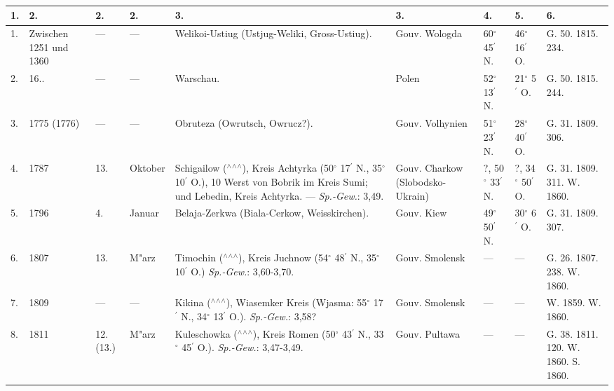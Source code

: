 \documentclass[a4paper, 8pt, oneside, polutonikogreek, german]{article}
\begin{document}
\subsubsection{}
\begin{center}
    \footnotesize
    \begin{longtable}{|p{3mm}|p{10mm}|p{5mm}|p{13mm}|p{25mm}|p{13mm}|p{10mm}|p{10mm}|p{11mm}|}
    \hline
        1. & 2. & 2. & 2. & 3. & 3. & 4. & 5. & 6. \\ \hline
        1. & Zwischen 1251 und 1360 & --- & --- & Welikoi-Ustiug (Ustjug-Weliki, Gross-Ustiug). & Gouv. Wologda & 60$^\circ$ 45$^\prime$ N. & 46$^\circ$ 16$^\prime$ O. & G. 50. 1815. 234. \\ \hline
        2. & 16.. & --- & --- & Warschau. & Polen & 52$^\circ$ 13$^\prime$ N. & 21$^\circ$ 5$^\prime$ O. & G. 50. 1815. 244. \\ \hline
        3. & 1775 (1776) & --- & --- & Obruteza (Owrutsch, Owrucz?). & Gouv. Volhynien & 51$^\circ$ 23$^\prime$ N. & 28$^\circ$ 40$^\prime$ O. & G. 31. 1809. 306. \\ \hline
        4. & 1787 & 13. & Oktober & Schigailow ($^\wedge$$^\wedge$$^\wedge$), Kreis Achtyrka (50$^\circ$ 17$^\prime$ N., 35$^\circ$ 10$^\prime$ O.), 10 Werst von Bobrik im Kreis Sumi; und Lebedin, Kreis Achtyrka. --- \emph{Sp.-Gew.}: 3,49. & Gouv. Charkow (Slobodsko-Ukrain) & ?, 50$^\circ$ 33$^\prime$ N. & ?, 34$^\circ$ 50$^\prime$ O. & G. 31. 1809. 311. W. 1860. \\ \hline
        5. & 1796 & 4. & Januar & Belaja-Zerkwa (Biala-Cerkow, Weisskirchen). & Gouv. Kiew & 49$^\circ$ 50$^\prime$ N. & 30$^\circ$ 6$^\prime$ O. & G. 31. 1809. 307. \\ \hline
        6. & 1807 & 13. & M"arz & Timochin ($^\wedge$$^\wedge$$^\wedge$), Kreis Juchnow (54$^\circ$ 48$^\prime$ N., 35$^\circ$ 10$^\prime$ O.) \emph{Sp.-Gew.}: 3,60-3,70. & Gouv. Smolensk & --- & --- & G. 26. 1807. 238. W. 1860. \\ \hline
        7. & 1809 & --- & --- & Kikina ($^\wedge$$^\wedge$$^\wedge$), Wiasemker Kreis (Wjasma: 55$^\circ$ 17$^\prime$ N., 34$^\circ$ 13$^\prime$ O.). \emph{Sp.-Gew.}: 3,58? & Gouv. Smolensk & --- & --- & W. 1859. W. 1860. \\ \hline
        8. & 1811 & 12. (13.) & M"arz & Kuleschowka ($^\wedge$$^\wedge$$^\wedge$), Kreis Romen (50$^\circ$ 43$^\prime$ N., 33$^\circ$ 45$^\prime$ O.). \emph{Sp.-Gew.}: 3,47-3,49. & Gouv. Pultawa & --- & --- & G. 38. 1811. 120. W. 1860. S. 1860. \\ \hline

\end{longtable}
\end{center}
\end{document}
